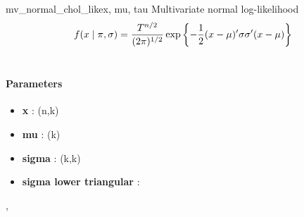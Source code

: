 \hypertarget{pymc.distributions.mv_normal_chol_like}{}\begin{funcdesc}{mv\_normal\_chol\_like}{x, mu, tau}
Multivariate normal log-likelihood
\begin{gather}
\begin{split}f(x \mid \pi, \sigma) = \frac{T^{n/2}}{(2\pi)^{1/2}} \exp\left\{ -\frac{1}{2} (x-\mu)^{\prime}\sigma \sigma^{\prime}(x-\mu) \right\}\end{split}\notag\\\begin{split}\end{split}\notag
\end{gather}\paragraph{Parameters}\begin{itemize}

\item[] \textbf{x} : (n,k)

\item[] \textbf{mu} : (k)

\item[] \textbf{sigma} : (k,k)

\item[] \textbf{sigma lower triangular} :
\end{itemize}



\hyperlink{pymc.distributions.mv_normal_like}{}, \hyperlink{pymc.distributions.mv_normal_cov_like}{}


\end{funcdesc}

